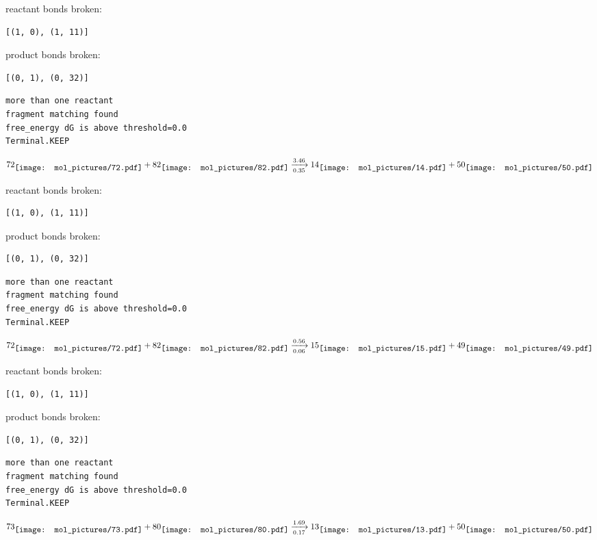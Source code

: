\documentclass{article}
\begin{document}
reactant bonds broken:\begin{verbatim}
[(1, 0), (1, 11)]
\end{verbatim}
product bonds broken:\begin{verbatim}
[(0, 1), (0, 32)]
\end{verbatim}




\vspace{1cm}
\begin{verbatim}
more than one reactant
fragment matching found
free_energy dG is above threshold=0.0
Terminal.KEEP
\end{verbatim}
$$
72
\raisebox{-.5\height}{\texttt{[image: mol\_pictures/72.pdf]}}
+
82
\raisebox{-.5\height}{\texttt{[image: mol\_pictures/82.pdf]}}
\xrightarrow[0.35]{3.46}
14
\raisebox{-.5\height}{\texttt{[image: mol\_pictures/14.pdf]}}
+
50
\raisebox{-.5\height}{\texttt{[image: mol\_pictures/50.pdf]}}
$$


reactant bonds broken:\begin{verbatim}
[(1, 0), (1, 11)]
\end{verbatim}
product bonds broken:\begin{verbatim}
[(0, 1), (0, 32)]
\end{verbatim}




\vspace{1cm}
\begin{verbatim}
more than one reactant
fragment matching found
free_energy dG is above threshold=0.0
Terminal.KEEP
\end{verbatim}
$$
72
\raisebox{-.5\height}{\texttt{[image: mol\_pictures/72.pdf]}}
+
82
\raisebox{-.5\height}{\texttt{[image: mol\_pictures/82.pdf]}}
\xrightarrow[0.06]{0.56}
15
\raisebox{-.5\height}{\texttt{[image: mol\_pictures/15.pdf]}}
+
49
\raisebox{-.5\height}{\texttt{[image: mol\_pictures/49.pdf]}}
$$


reactant bonds broken:\begin{verbatim}
[(1, 0), (1, 11)]
\end{verbatim}
product bonds broken:\begin{verbatim}
[(0, 1), (0, 32)]
\end{verbatim}




\vspace{1cm}
\begin{verbatim}
more than one reactant
fragment matching found
free_energy dG is above threshold=0.0
Terminal.KEEP
\end{verbatim}
$$
73
\raisebox{-.5\height}{\texttt{[image: mol\_pictures/73.pdf]}}
+
80
\raisebox{-.5\height}{\texttt{[image: mol\_pictures/80.pdf]}}
\xrightarrow[0.17]{1.69}
13
\raisebox{-.5\height}{\texttt{[image: mol\_pictures/13.pdf]}}
+
50
\raisebox{-.5\height}{\texttt{[image: mol\_pictures/50.pdf]}}
$$
\end{document}
